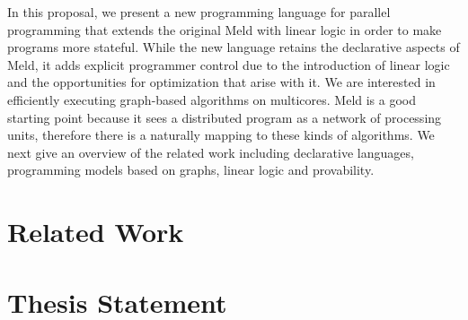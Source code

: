 In this proposal, we present a new programming language for parallel programming that extends the
original Meld with linear logic in order to make programs more stateful. While the new language retains
the declarative aspects of Meld, it adds explicit programmer control
due to the introduction of linear logic and the opportunities for optimization that arise with it.
We are interested in efficiently executing graph-based algorithms on multicores. Meld is a good
starting point because it sees a distributed program as a network of processing units, therefore
there is a naturally mapping to these kinds of algorithms.
We next give an overview of the related work including declarative languages, programming models
based on graphs, linear logic and provability.

\section{Related Work}



\section{Thesis Statement}


